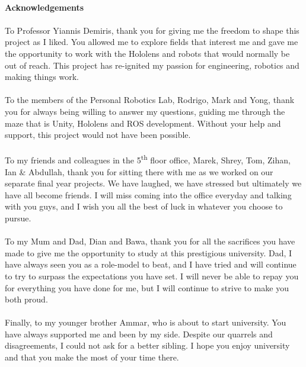 \newpage

\paragraph{Acknowledgements}

\paragraph{}To Professor Yiannis Demiris, thank you for giving me the freedom to shape this project as I liked. You allowed me to explore fields that interest me and gave me the opportunity to work with the Hololens and robots that would normally be out of reach. This project has re-ignited my passion for engineering, robotics and making things work.

\paragraph{}To the members of the Personal Robotics Lab, Rodrigo, Mark and Yong, thank you for always being willing to answer my questions, guiding me through the maze that is Unity, Hololens and ROS development. Without your help and support, this project would not have been possible.

\paragraph{}To my friends and colleagues in the 5\textsuperscript{th} floor office, Marek, Shrey, Tom, Zihan, Ian \& Abdullah, thank you for sitting there with me as we worked on our separate final year projects. We have laughed, we have stressed but ultimately we have all become friends. I will miss coming into the office everyday and talking with you guys, and I wish you all the best of luck in whatever you choose to pursue.

\paragraph{}To my Mum and Dad, Dian and Bawa, thank you for all the sacrifices you have made to give me the opportunity to study at this prestigious university. Dad, I have always seen you as a role-model to beat, and I have tried and will continue to try to surpass the expectations you have set. I will never be able to repay you for everything you have done for me, but I will continue to strive to make you both proud.

\paragraph{}Finally, to my younger brother Ammar, who is about to start university. You have always supported me and been by my side. Despite our quarrels and disagreements, I could not ask for a better sibling. I hope you enjoy university and that you make the most of your time there.

